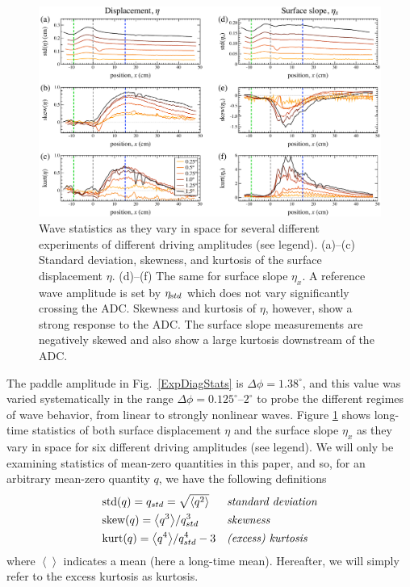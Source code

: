 \documentclass[11pt]{article}
\newcommand{\mean}[1]{\left< #1 \right>}
\newcommand{\etastd}{\eta_{\text std}}
\newcommand{\skw}{\text{skew}}
\newcommand{\var}{\text{var}}
\newcommand{\kurt}{\text{kurt}}
\newcommand{\std}{\text{std}}
\newcommand{\Dphi}{\Delta \phi}
\begin{document}
\begin{figure}%
\begin{center}
\includegraphics[width = 0.85 \linewidth]{Figs/ExpSpatialStats.pdf}
\caption{Wave statistics as they vary in space for several different experiments of different driving amplitudes (see legend). (a)--(c) Standard deviation, skewness, and kurtosis of the surface displacement $\eta$. (d)--(f) The same for surface slope $\eta_x$. A reference wave amplitude is set by $\etastd$ which does not vary significantly crossing the ADC. Skewness and kurtosis of $\eta$, however, show a strong response to the ADC. The surface slope measurements are negatively skewed and also show a large kurtosis downstream of the ADC. }
\label{ExpSpatialStats}
\end{center}
\end{figure}
 
	The paddle amplitude in Fig.~\ref{ExpDiagStats} is $\Dphi = 1.38^{\circ}$, and this value was varied systematically in the range $\Dphi = 0.125^{\circ}$--$2^{\circ}$ to probe the different regimes of wave behavior, from linear to strongly nonlinear waves. Figure \ref{ExpSpatialStats} shows long-time statistics of both surface displacement $\eta$ and the surface slope $\eta_x$ as they vary in space for six different driving amplitudes (see legend). We will only be examining statistics of mean-zero quantities in this paper, and so, for an arbitrary mean-zero quantity $q$, we have the following definitions
\begin{align}
& \std(q) = q_{std}= \sqrt{\mean{q^2}}
&&\mbox{\em standard deviation} \\
& \skw(q) = {\mean{q^3}} / {q_{std}^3}	
&&\mbox{\em skewness} \\
& \kurt(q) = {\mean{q^4}} / {q_{std}^4} - 3
&&\mbox{\em (excess) kurtosis}
\end{align}
where $\mean{}$ indicates a mean (here a long-time mean). Hereafter, we will simply refer to the excess kurtosis as kurtosis.
\end{document}
